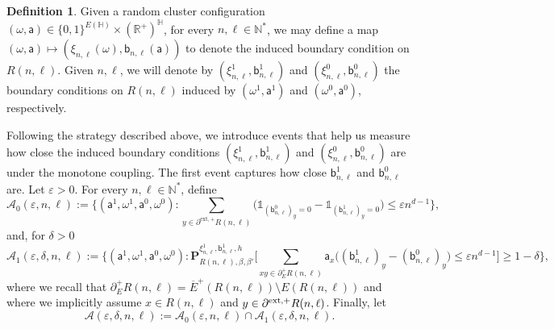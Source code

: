 \documentclass[11pt,a4paper]{article}
\numberwithin{equation}{section}
\theoremstyle{plain}
\theoremstyle{definition}
\newtheorem{Def}[Thm]{Definition}
\begin{document}
\begin{Def} Given a random cluster configuration $(\omega,\mathsf a)\in \{0,1\}^{E(\mathbb H)}\times (\mathbb R^+)^{\mathbb H}$, for every $n,\ell \in \mathbb N^*$, we may define a map $(\omega, \mathsf a) \mapsto (\xi_{n,\ell}(\omega), \mathsf b_{n,\ell}(\mathsf a))$ to denote the induced boundary condition on $R(n,\ell)$. Given $n,\ell$, we will denote by $(\xi^1_{n,\ell}, \mathsf b^1_{n,\ell})$ and $(\xi^0_{n,\ell}, \mathsf b^0_{n,\ell})$ the boundary conditions on $R(n,\ell)$ induced by $(\omega^1,\mathsf a^1)$ and $(\omega^0,\mathsf a^0)$, respectively. 
\end{Def}

Following the strategy described above, we introduce events that help us measure how close the induced boundary conditions $(\xi^1_{n,\ell}, \mathsf b^1_{n,\ell})$ and $(\xi^0_{n,\ell}, \mathsf b^0_{n,\ell})$ are under the monotone coupling. The first event captures how close $\mathsf{b}_{n,\ell}^1$ and $\mathsf{b}_{n,\ell}^0$ are. Let $\varepsilon>0$. For every $n,\ell \in \mathbb N^*$, define
\begin{equation}
\mathcal A_0(\varepsilon,n,\ell):= \Big\{ (\mathsf a^1,\omega^1,  \mathsf a^0,\omega^0) : \sum_{y \in \partial^{\mathrm{ext},+} R(n,\ell)} \Big(\mathds{1}_{(\mathsf{b}_{n,\ell}^0)_y=0}-\mathds{1}_{(\mathsf{b}_{n,\ell}^1)_y=0}\Big)\leq \varepsilon n^{d-1}\Big\}, 
\end{equation}
and, for $\delta>0$
\begin{equation}
\mathcal A_1(\varepsilon,\delta,n,\ell):= \Big\{ (\mathsf a^1,\omega^1,  \mathsf a^0,\omega^0) : \mathbf P^{\xi^1_{n,\ell}, \mathsf b^1_{n,\ell},h}_{R(n,\ell), \beta, \beta'}\Big[\sum_{xy \in \partial^{+}_E R(n,\ell)} \mathsf a_x \Big((\mathsf b^1_{n,\ell})_y - (\mathsf b^0_{n,\ell})_y\Big)\leq \varepsilon n^{d-1}\Big]\geq 1-\delta \Big\}, 
\end{equation}
where we recall that $\partial^+_E R(n,\ell)=\overline{E}^+(R(n,\ell))\setminus E(R(n,\ell))$ and where we implicitly assume $x \in R(n,\ell)$ and $y \in \partial^{\rm ext,+}R(n,\ell)$. Finally, let
\begin{equation}
    \mathcal{A}(\varepsilon,\delta,n,\ell):=\mathcal A_0(\varepsilon,n,\ell)\cap \mathcal A_1(\varepsilon,\delta,n,\ell).
\end{equation}
\end{document}
